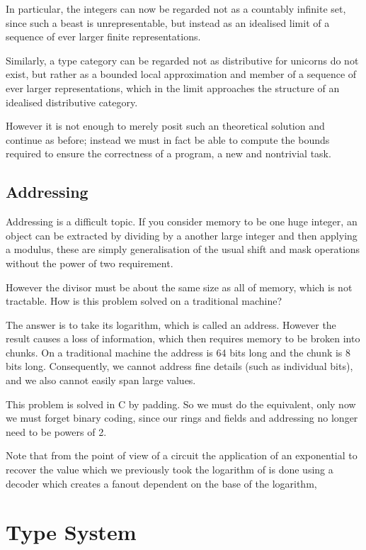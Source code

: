 \documentclass[oneside]{book}
\theoremstyle{plain}
\theoremstyle{definition}
\theoremstyle{plain}
\begin{document}
In particular, the integers can now be regarded not as a countably infinite set,
since such a beast is unrepresentable, but instead as an idealised limit
of a sequence of ever larger finite representations.

Similarly, a type category can be regarded not as distributive for unicorns
do not exist, but rather as a bounded local approximation and member of
a sequence of ever larger representations, which in the limit approaches
the structure of an idealised distributive category.

However it is not enough to merely posit such an theoretical solution
and continue as before; instead we must in fact be able to compute
the bounds required to ensure the correctness of a program, a new
and nontrivial task.

\section{Addressing}
Addressing is a difficult topic. If you consider memory to be one
huge integer, an object can be extracted by dividing by a
another large integer and then applying a modulus, these are
simply generalisation of the usual shift and mask operations without
the power of two requirement.

However the divisor must be about the same size as all of memory,
which is not tractable. How is this problem solved on a traditional
machine?

The answer is to take its logarithm, which is called an address.
However the result causes a loss of information, which then requires
memory to be broken into chunks. On a traditional machine the address
is 64 bits long and the chunk is 8 bits long. Consequently, we cannot
address fine details (such as individual bits), and we also cannot
easily span large values.

This problem is solved in C by padding. So we must do the equivalent,
only now we must forget binary coding, since our rings and fields
and addressing no longer need to be powers of 2.

Note that from the point of view of a circuit the application of an exponential
to recover the value which we previously took the logarithm of is done
using a decoder which creates a fanout dependent on the base of the logarithm,

\chapter{Type System}
\end{document}
